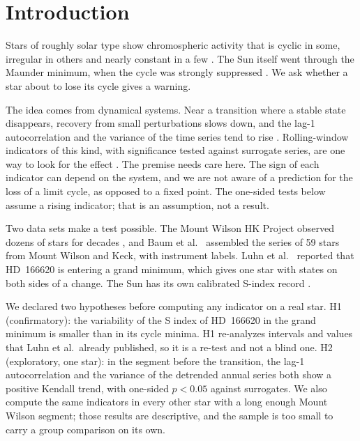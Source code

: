 \section{Introduction}

Stars of roughly solar type show chromospheric activity that is cyclic in some, irregular in others and nearly constant in a few \cite{baliunas1995}. The Sun itself went through the Maunder minimum, when the cycle was strongly suppressed \cite{usoskin2017}. We ask whether a star about to lose its cycle gives a warning.

The idea comes from dynamical systems. Near a transition where a stable state disappears, recovery from small perturbations slows down, and the lag-1 autocorrelation and the variance of the time series tend to rise \cite{scheffer2009,held2004}. Rolling-window indicators of this kind, with significance tested against surrogate series, are one way to look for the effect \cite{dakos2012}. The premise needs care here. The sign of each indicator can depend on the system, and we are not aware of a prediction for the loss of a limit cycle, as opposed to a fixed point. The one-sided tests below assume a rising indicator; that is an assumption, not a result.

Two data sets make a test possible. The Mount Wilson HK Project observed dozens of stars for decades \cite{baliunas1995}, and Baum et al.\ \cite{baum2022} assembled the series of 59 stars from Mount Wilson and Keck, with instrument labels. Luhn et al.\ \cite{luhn2022} reported that HD~166620 is entering a grand minimum, which gives one star with states on both sides of a change. The Sun has its own calibrated S-index record \cite{egeland2017}.

We declared two hypotheses before computing any indicator on a real star. H1 (confirmatory): the variability of the S index of HD~166620 in the grand minimum is smaller than in its cycle minima. H1 re-analyzes intervals and values that Luhn et al.\ already published, so it is a re-test and not a blind one. H2 (exploratory, one star): in the segment before the transition, the lag-1 autocorrelation and the variance of the detrended annual series both show a positive Kendall trend, with one-sided $p < 0.05$ against surrogates. We also compute the same indicators in every other star with a long enough Mount Wilson segment; those results are descriptive, and the sample is too small to carry a group comparison on its own.
